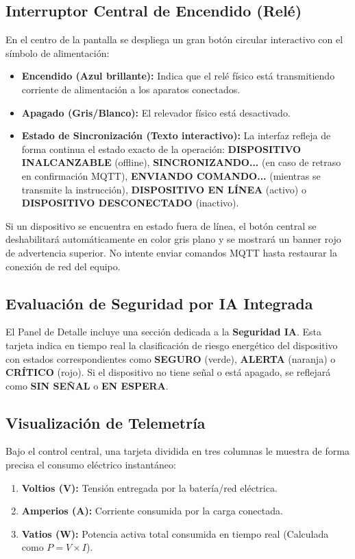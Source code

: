 \documentclass[11pt,a4paper]{article}
\begin{document}
\subsection{Interruptor Central de Encendido (Relé)}
En el centro de la pantalla se despliega un gran botón circular interactivo con el símbolo de alimentación:
\begin{itemize}
    \item \textbf{Encendido (Azul brillante):} Indica que el relé físico está transmitiendo corriente de alimentación a los aparatos conectados.
    \item \textbf{Apagado (Gris/Blanco):} El relevador físico está desactivado.
    \item \textbf{Estado de Sincronización (Texto interactivo):} La interfaz refleja de forma continua el estado exacto de la operación: \textbf{DISPOSITIVO INALCANZABLE} (offline), \textbf{SINCRONIZANDO...} (en caso de retraso en confirmación MQTT), \textbf{ENVIANDO COMANDO...} (mientras se transmite la instrucción), \textbf{DISPOSITIVO EN LÍNEA} (activo) o \textbf{DISPOSITIVO DESCONECTADO} (inactivo).
\end{itemize}

\begin{alertBox}
Si un dispositivo se encuentra en estado fuera de línea, el botón central se deshabilitará automáticamente en color gris plano y se mostrará un banner rojo de advertencia superior. No intente enviar comandos MQTT hasta restaurar la conexión de red del equipo.
\end{alertBox}

\subsection{Evaluación de Seguridad por IA Integrada}
El Panel de Detalle incluye una sección dedicada a la \textbf{Seguridad IA}. Esta tarjeta indica en tiempo real la clasificación de riesgo energético del dispositivo con estados correspondientes como \textbf{SEGURO} (verde), \textbf{ALERTA} (naranja) o \textbf{CRÍTICO} (rojo). Si el dispositivo no tiene señal o está apagado, se reflejará como \textbf{SIN SEÑAL} o \textbf{EN ESPERA}.

\subsection{Visualización de Telemetría}
Bajo el control central, una tarjeta dividida en tres columnas le muestra de forma precisa el consumo eléctrico instantáneo:
\begin{enumerate}
    \item \textbf{Voltios (V):} Tensión entregada por la batería/red eléctrica.
    \item \textbf{Amperios (A):} Corriente consumida por la carga conectada.
    \item \textbf{Vatios (W):} Potencia activa total consumida en tiempo real (Calculada como $P = V \times I$).
\end{enumerate}
\end{document}

